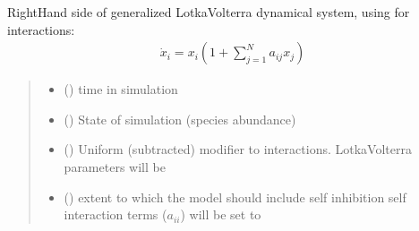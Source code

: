 \documentclass[letterpaper,10pt,english]{sphinxmanual}
\begin{document}
\begin{fulllineitems}
\begin{fulllineitems}
\label{\detokenize{friendlynets:friendlyNet.friendlyNet.lotka_volterra_system}}
\pysigstartsignatures
{}
\pysigstopsignatures
\sphinxAtStartPar
Right\sphinxhyphen{}Hand side of generalized Lotka\sphinxhyphen{}Volterra dynamical system, using {\hyperref[\detokenize{friendlynets:friendlyNet.friendlyNet.Adjacency}]{}} for interactions:
\begin{equation*}
\begin{split}\dot{x}_i = x_i(1+\sum_{j=1}^N a_{ij} x_j)\end{split}
\end{equation*}\begin{quote}\begin{description}
\begin{itemize}
\item {} 
\sphinxAtStartPar
{} () \textendash{} time in simulation

\item {} 
\sphinxAtStartPar
{} (\sphinxstyleliteralemphasis{\sphinxupquote{{[}}}\sphinxstyleliteralemphasis{\sphinxupquote{{]}}}) \textendash{} State of simulation (species abundance)

\item {} 
\sphinxAtStartPar
{} () \textendash{} Uniform (subtracted) modifier to interactions. Lotka\sphinxhyphen{}Volterra parameters will be {\hyperref[\detokenize{friendlynets:friendlyNet.friendlyNet.Adjacency}]{}} \sphinxhyphen{} 

\item {} 
\sphinxAtStartPar
{} () \textendash{} extent to which the model should include self inhibition \sphinxhyphen{} self interaction terms (\(a_{ii}\)) will be set to \sphinxhyphen{}


\end{itemize}
\end{description}
\end{quote}
\end{fulllineitems}
\end{fulllineitems}
\end{document}
